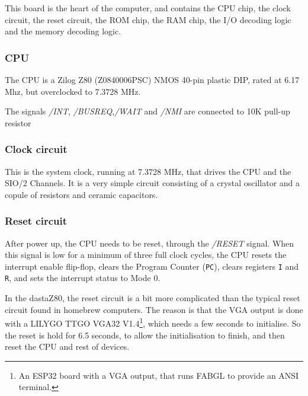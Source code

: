 \documentclass[a4paper,11pt]{article}
\begin{document}
    This board is the heart of the computer, and contains the CPU chip, the 
    clock circuit, the reset circuit, the ROM chip, the RAM chip, the I/O
    decoding logic and the memory decoding logic.

    \subsubsection{CPU}

    The CPU is a Zilog Z80 (Z0840006PSC) NMOS 40-pin plastic DIP, rated at 6.17
    Mhz, but overclocked to 7.3728 MHz.

    The signals \textit{/INT}, \textit{/BUSREQ},\textit{/WAIT} and \textit{/NMI}
    are connected to 10K pull-up resistor

    \subsubsection{Clock circuit}

    This is the system clock, running at 7.3728 MHz, that drives the CPU and the
    SIO/2 Channels. It is a very simple circuit consisting of a crystal
    oscillator and a copule of resistors and ceramic capacitors.

    \subsubsection{Reset circuit}
    
    After power up, the CPU needs to be reset, through the \textit{/RESET}
    signal. When this signal is low for a minimum of three full clock cycles,
    the CPU resets the interrupt enable flip-flop, clears the Program Counter
    (\texttt{PC}), clears registers \texttt{I} and \texttt{R}, and sets the
    interrupt status to Mode 0. 

    In the dastaZ80, the reset circuit is a bit more complicated than the 
    typical reset circuit found in homebrew computers. The reason is that the
    VGA output is done with a LILYGO TTGO  VGA32 V1.4\footnote{An ESP32 board
    with a VGA output, that runs FABGL to provide an ANSI terminal.}, which
    needs a few seconds to initialise. So the reset is hold for 6.5 seconds, to
    allow the initialisation to finish,  and then reset the CPU and rest of
    devices.
\end{document}

